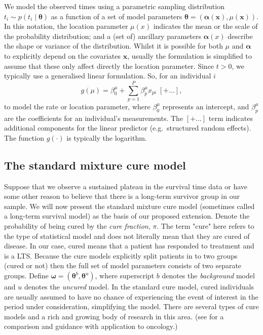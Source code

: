 \documentclass[AMA,STIX1COL]{WileyNJD-v2}
\begin{document}
We model the observed times using a parametric sampling distribution $t_{i} \sim p(t_{i} \mid \bm\theta)$ as a function of a set of model parameters $\bm\theta = (\bm\alpha(\bm x), \mu(\bm x))$. 
In this notation, the location parameter $\mu(x)$ indicates the mean or the scale of the probability distribution; and a (set of) ancillary parameters $\bm \alpha(x)$ describe the shape or variance of the distribution.
Whilst it is possible for both $\mu$ and $\bm\alpha$ to explicitly depend on the covariates $\bm x$, usually the formulation is simplified to assume that these only affect directly the location parameter.
Since $t>0$, we typically use a generalised linear formulation.
So, for an individual $i$
$$
g(\mu) = \beta^{\mu}_{0} + \sum_{p=1}^P \beta^{\mu}_{p} x_{pi} \; [+ \ldots ],
$$
to model the rate or location parameter,
where $\beta^{\mu}_{0}$ represents an intercept,
and $\beta^{\mu}_{p}$ are the coefficients for an individual's measurements.
The $[+ \ldots]$ term indicates additional components for the linear predictor (e.g.~structured random effects).
The function $g(\cdot)$ is typically the logarithm.

\subsection{The standard mixture cure model} \label{section:basic_model}
Suppose that we observe a sustained plateau in the survival time data or have some other reason to believe that there is a long-term survivor group in our sample. We will now present the standard mixture cure model (sometimes called a long-term survival model) as the basis of our proposed extension.
Denote the probability of being cured by the {\it cure fraction}, $\pi$.
The term "cure" here refers to the type of statistical model and does not literally mean that they are cured of disease. In our case, cured means that a patient has responded to treatment and is a LTS.
Because the cure models explicitly split patients in to two groups (cured or not) then the full set of model parameters consists of two separate groups.
Define $\bm\omega = (\bm\theta^b, \bm\theta^u)$, where superscript $b$ denotes the \textit{background} model and $u$ denotes the \textit{uncured} model.
In the standard cure model, cured individuals are usually assumed to have no chance of experiencing the event of interest in the period under consideration, simplifying the model.
There are several types of cure models and a rich and growing body of research in this area.
(see \citep{Yu2013} for a comparison and guidance with application to oncology.)
\end{document}
